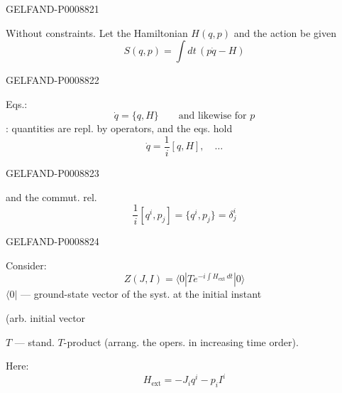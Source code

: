 \begin{GelfandAdjacentEvidence}{GELFAND-P000882}{1}

Without constraints. Let the Hamiltonian $H(q,p)$ and the action be given
\begin{equation*}
S(q,p)=\int dt\,(p\dot q-H)
\tag{22}
\end{equation*}
\end{GelfandAdjacentEvidence}
\begin{GelfandAdjacentEvidence}{GELFAND-P000882}{2}


Eqs.:
\begin{equation*}
\dot q=\{q,H\}\qquad\text{and likewise for }p
\tag{23}
\end{equation*}
: quantities are repl. by operators, and the eqs. hold
\begin{equation*}
\dot q=\frac1i[q,H],\quad\ldots
\tag{24}
\end{equation*}
\end{GelfandAdjacentEvidence}
\begin{GelfandAdjacentEvidence}{GELFAND-P000882}{3}


and the commut. rel.
\begin{equation*}
\frac1i[q^i,p_j]=\{q^i,p_j\}=\delta^i_j
\tag{25}
\end{equation*}
\end{GelfandAdjacentEvidence}
\begin{GelfandAdjacentEvidence}{GELFAND-P000882}{4}


Consider:
\begin{equation*}
Z(J,I)=\langle0|T e^{-i\int H_{\mathrm{ext}}\,dt}|0\rangle
\tag{26}
\end{equation*}
$\langle0|$ --- ground-state vector of the syst. at the initial instant

\hspace{3em}(arb. initial vector

$T$ --- stand. $T$-product (arrang. the opers. in increasing time order).

Here:
\begin{equation*}
H_{\mathrm{ext}}=-J_iq^i-p_iI^i
\tag{27}
\end{equation*}
\end{GelfandAdjacentEvidence}
